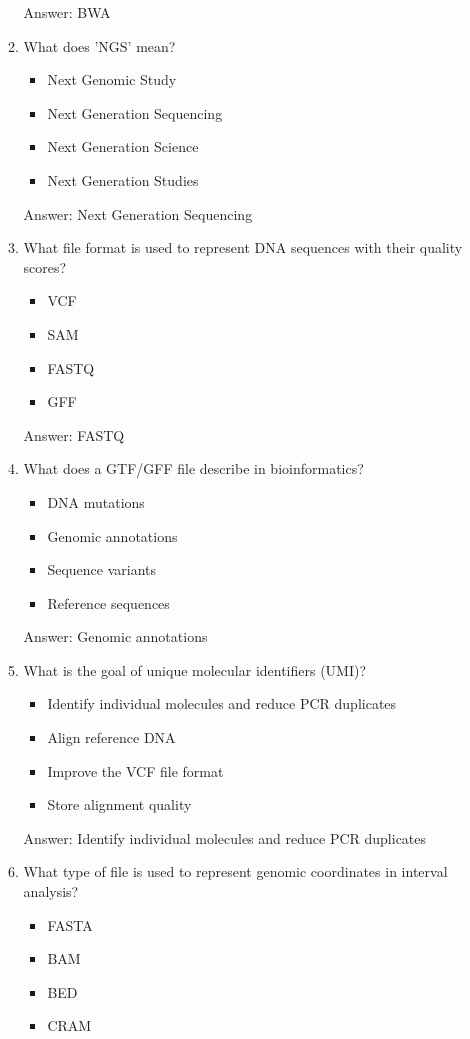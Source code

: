 \begin{itemize}
\begin{enumerate}
Answer: BWA

\item What does 'NGS' mean?
\begin{itemize}
\item Next Genomic Study
\item Next Generation Sequencing
\item Next Generation Science
\item Next Generation Studies
\end{itemize}

Answer: Next Generation Sequencing

\item What file format is used to represent DNA sequences with their quality scores?
\begin{itemize}
\item VCF
\item SAM
\item FASTQ
\item GFF
\end{itemize}

Answer: FASTQ

\item What does a GTF/GFF file describe in bioinformatics?
\begin{itemize}
\item DNA mutations
\item Genomic annotations
\item Sequence variants
\item Reference sequences
\end{itemize}

Answer: Genomic annotations

\item What is the goal of unique molecular identifiers (UMI)?
\begin{itemize}
\item Identify individual molecules and reduce PCR duplicates
\item Align reference DNA
\item Improve the VCF file format
\item Store alignment quality
\end{itemize}

Answer: Identify individual molecules and reduce PCR duplicates

\item What type of file is used to represent genomic coordinates in interval analysis?
\begin{itemize}
\item FASTA
\item BAM
\item BED
\item CRAM
\end{itemize}


\end{enumerate}
\end{itemize}
